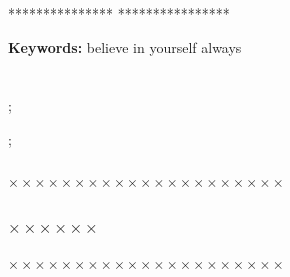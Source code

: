 \documentclass{article}
\begin{document}
    \linespread{1.4}
    *************** ****************
   

    \bigskip
    \noindent\textbf{ Keywords:} 
    believe in yourself always



    \newpage
    \setcounter{secnumdepth}{4}%
    \setcounter{tocdepth}{2}%

    \renewcommand\contentsname{\zihao{3}\heiti\textbf{ \quad  }}
  
    \begin{spacing}{1.7}
        {\centering
    \end{spacing}
    \thispagestyle{mulu}
    \vspace*{16pt}
	




    \setcounter{page}{0} %

    \pagestyle{yemei}
    \newpage
    \setcounter{page}{1} %

    \section{ }
    \markboth{\text{ }\thesection\text{ } \quad  }{\text{ }\thesection\text{ } \quad  }   

    \subsection{ }
    
         
       ; 
      
      
       
       ; 
      
      
    


    

    \subsubsection{ }
    $\times \times \times\times \times \times\times \times \times\times \times \times\times \times \times\times \times \times\times \times \times$

    \subsubsection{$\times \times \times\times \times \times$}
    $\times \times \times\times \times \times\times \times \times\times \times \times\times \times \times\times \times \times\times \times \times$
\end{document}
